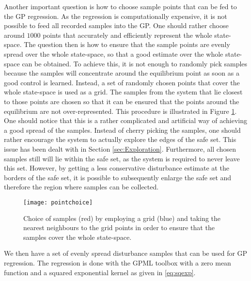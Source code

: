 \documentclass[../main.tex]{subfiles}
\begin{document}
Another important question is how to choose sample points that can be fed to the GP regression. As the regression is computationally expensive, it is not possible to feed all recorded samples into the GP. One should rather choose around $1000$ points that accurately and efficiently represent the whole state-space. The question then is how to ensure that the sample points are evenly spread over the whole state-space, so that a good estimate over the whole state-space can be obtained. To achieve this, it is not enough to randomly pick samples because the samples will concentrate around the equilibrium point as soon as a good control is learned. Instead, a set of randomly chosen points that cover the whole state-space is used as a grid. The samples from the system that lie closest to those points are chosen so that it can be ensured that the points around the equilibrium are not over-represented.  This procedure is illustrated in Figure \ref{fig:pointchoice}. One should notice that this is a rather complicated and artificial way of achieving a good spread of the samples. Instead of cherry picking the samples, one should rather encourage the system to actually explore the edges of the safe set. This issue has been dealt with in Section \ref{sec:Exploration}. Furthermore, all chosen samples still will lie within the safe set, as the system is required to never leave this set. However, by getting a less conservative disturbance estimate at the borders of the safe set, it is possible to subsequently enlarge the safe set and therefore the region where samples can be collected.

\begin{figure}
    \centering
    \texttt{[image: pointchoice]}
        \caption{Choice of samples (red) by employing a grid (blue) and taking the nearest neighbours to the grid points in order to ensure that the samples cover the whole state-space.}  \label{fig:pointchoice}
\end{figure}

We then have a set of evenly spread disturbance samples that can be used for GP regression. The regression is done with the GPML toolbox \cite{Rasmussen:2010:GPM:1756006.1953029} with a zero mean function and a squared exponential kernel as given in \eqref{eq:sqexp}.
\end{document}
